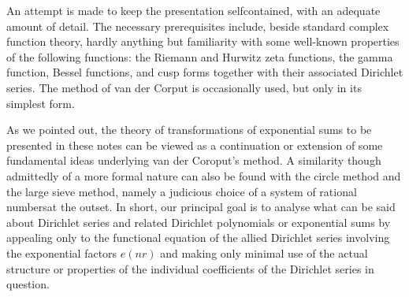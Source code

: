 An attempt is made to keep the presentation selfcontained, with an
adequate amount of detail. The necessary prerequisites include, beside
standard complex function theory, hardly anything but familiarity with
some well-known properties of the following functions: the Riemann and
Hurwitz zeta functions, the gamma function, Bessel functions, and cusp
forms together with their associated Dirichlet series. The method of
van der Corput is occasionally used, but only in its simplest form. 

As we pointed out, the theory of transformations of exponential sums
to be presented in these notes can be viewed as a continuation or
extension of some fundamental ideas underlying van der Coroput's
method. A similarity though admittedly of a more formal nature can
also be found with the circle method and the large sieve method,
namely a judicious choice of a system of rational
numbers\pageoriginale at the outset. In short, our principal goal is
to analyse what can be said about Dirichlet series and related
Dirichlet polynomials or exponential sums by appealing only to the
functional equation of the allied Dirichlet series involving the
exponential factors $e(nr)$ and making only minimal use of the actual
structure or properties of the individual coefficients of the
Dirichlet series in question. 
